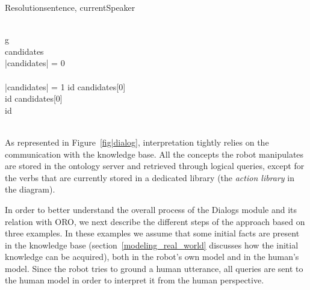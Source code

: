 \documentclass{svmult}
\begin{document}
\small
\begin{pseudocode}[ruled]{Resolution}{sentence, currentSpeaker}
\label{algo|Resolution}

 \GETS {} \\

\FOREACH g \in {} \DO 
\BEGIN
    \GETS {} \\
   candidates \GETS {} \\
   
   \IF \left|{candidates}\right| = 0 \THEN
    \BEGIN
       \\
      \EXIT \\
    \END
   \ELSEIF \left|{candidates}\right| = 1 \THEN
      id \GETS candidates[0]\\

   \ELSE
      \BEGIN
	\IF {} \THEN
	  id \GETS candidates[0] \\
	\ELSE
	  id \GETS {} \\
      \END \\
\END
\end{pseudocode}
\normalsize

As represented in Figure~\ref{fig|dialog}, interpretation tightly relies on the
communication with the knowledge base. All the concepts the robot manipulates
are stored in the ontology server and retrieved through logical
queries, except for the verbs that are currently stored in a dedicated library
(the \emph{action library} in the diagram).


In order to better understand the overall process of the {\sc Dialogs} module 
and its relation with ORO, we next describe the different steps of the approach 
based on three examples. In these examples we assume that some initial facts 
are present in the knowledge base (section~\ref{modeling_real_world} discusses how 
the initial knowledge can be acquired), both in the robot's own model and in the human's model.  Since the robot tries to ground a human utterance, all queries are sent to the human model in order to interpret it from the human perspective. 
\end{document}
